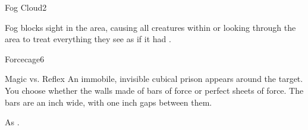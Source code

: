 \begin{spellsection}{Fog Cloud}{2}
\begin{spellheader}
\end{spellheader}
\begin{spellcontent}
    \begin{spelltargetinginfo}
    \end{spelltargetinginfo}
    \begin{spelleffects}
        \spelleffect Fog blocks sight in the area, causing all creatures within or looking through the area to treat everything they see as if it had \concealment.
        \spelldur \durshort
    \end{spelleffects}
\end{spellcontent}
\begin{spellfooter}
    \spellnotes \fogspellnotes \fogwindspellnotes

    \physicalspellnotes
\end{spellfooter}
\end{spellsection}

\begin{spellsection}{Forcecage}{6}
\begin{spellheader}
    \spellrng{\rngmed}
\end{spellheader}
\begin{spellcontent}
    \begin{spelltargetinginfo}
    \end{spelltargetinginfo}
    \begin{spelleffects}
        \begin{spellattack}{Magic vs. Reflex}
            \spellsuccess An immobile, invisible cubical prison appears around the target. You choose whether the walls made of bars of force or perfect sheets of force. The bars are an inch wide, with one inch gaps between them.
        \end{spellattack}
        \spelldur \durshort \dismissable
    \end{spelleffects}
\end{spellcontent}
\begin{spellfooter}
    \spellnotes As .
\end{spellfooter}
\end{spellsection}

